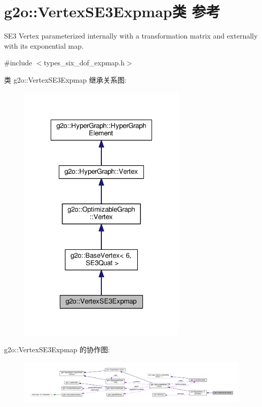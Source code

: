 \hypertarget{classg2o_1_1VertexSE3Expmap}{\section{g2o\-:\-:Vertex\-S\-E3\-Expmap类 参考}
\label{classg2o_1_1VertexSE3Expmap}
}


S\-E3 Vertex parameterized internally with a transformation matrix and externally with its exponential map.  




{\ttfamily \#include $<$types\-\_\-six\-\_\-dof\-\_\-expmap.\-h$>$}



类 g2o\-:\-:Vertex\-S\-E3\-Expmap 继承关系图\-:
\nopagebreak
\begin{figure}[H]
\begin{center}
\leavevmode
\includegraphics[width=228pt]{classg2o_1_1VertexSE3Expmap__inherit__graph}
\end{center}
\end{figure}


g2o\-:\-:Vertex\-S\-E3\-Expmap 的协作图\-:
\nopagebreak
\begin{figure}[H]
\begin{center}
\leavevmode
\includegraphics[width=350pt]{classg2o_1_1VertexSE3Expmap__coll__graph}
\end{center}
\end{figure}
